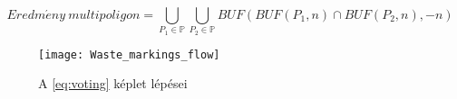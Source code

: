 \begin{equation}\label{eq:voting}
    Eredm\acute{e}ny \ multipoligon = \bigcup_{P_1 \in \mathbb{P}} \bigcup_{P_2 \in \mathbb{P}} BUF(BUF(P_1,n) \cap BUF(P_2,n),-n)
\end{equation}

\begin{figure}[H]
	\centering
	\texttt{[image: Waste\_markings\_flow]}
	\caption{A \ref{eq:voting} képlet lépései}
    \label{fig:union-intersection}
\end{figure}